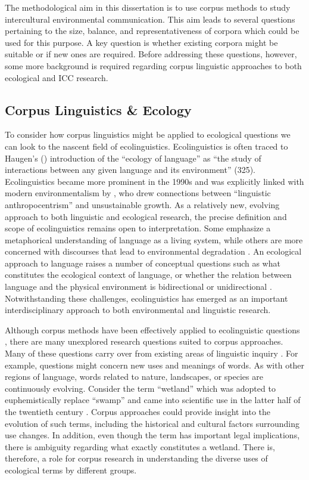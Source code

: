 The methodological aim in this dissertation is to use corpus methods to study intercultural environmental communication. This aim leads to several questions pertaining to the size, balance, and representativeness of corpora which could be used for this purpose. A key question is whether existing corpora might be suitable or if new ones are required. Before addressing these questions, however, some more background is required regarding corpus linguistic approaches to both ecological and ICC research.

\subsection{Corpus Linguistics \& Ecology}

To consider how corpus linguistics might be applied to ecological questions we can look to the nascent field of ecolinguistics. Ecolinguistics is often traced to Haugen's (\citeyear{Haugen1972a}) introduction of the ``ecology of language'' as ``the study of interactions between any given language and its environment'' (325). Ecolinguistics became more prominent in the 1990s and was explicitly linked with modern environmentalism by \cite*{Halliday2001a}, who drew connections between ``linguistic anthropocentrism'' and unsustainable growth. As a relatively new, evolving approach to both linguistic and ecological research, the precise definition and scope of ecolinguistics remains open to interpretation. Some emphasize a metaphorical understanding of language as a living system, while others are more concerned with discourses that lead to environmental degradation \citep[see][for an overview]{Chen2016a}. An ecological approach to language raises a number of conceptual questions such as what constitutes the ecological context of language, or whether the relation between language and the physical environment is bidirectional or unidirectional \citep{DoCouto2014a}. Notwithstanding these challenges, ecolinguistics has emerged as an important interdisciplinary approach to both environmental and linguistic research. 

Although corpus methods have been effectively applied to ecolinguistic questions \citep[e.g.,][]{Poole2016a, Poole2018, Stibbe2003a}, there are many unexplored research questions suited to corpus approaches. Many of these questions carry over from existing areas of linguistic inquiry \citep[see][]{Cheng2012a}. For example, questions might concern new uses and meanings of words. As with other regions of language, words related to nature, landscapes, or species are continuously evolving. Consider the term ``wetland'' which was adopted to euphemistically replace ``swamp'' and came into scientific use in the latter half of the twentieth century \citep{NationalResearchCouncil1995}. Corpus approaches could provide insight into the evolution of such terms, including the historical and cultural factors surrounding use changes. In addition, even though the term has important legal implications, there is ambiguity regarding what exactly constitutes a wetland. There is, therefore, a role for corpus research in understanding the diverse uses of ecological terms by different groups.

